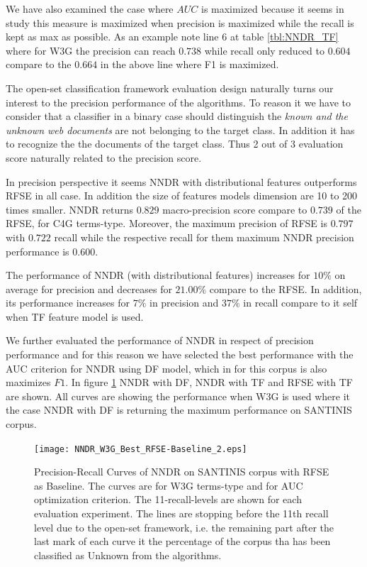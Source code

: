 We have also examined the case where $AUC$ is maximized because it seems in \cite{pritsos2018open} study this measure is maximized when precision is maximized while the recall is kept as max as possible. As an example note line 6 at table \ref{tbl:NNDR_TF} where for W3G the precision can reach $0.738$ while recall only reduced to $0.604$ compare to the $0.664$ in the above line where F1 is maximized.

The open-set classification framework evaluation design naturally turns our interest to the precision performance of the algorithms. To reason it we have to consider that a classifier in a binary case should distinguish the \textit{known and the unknown web documents} are not belonging to the target class. In addition it has to recognize the the documents of the target class. Thus 2 out of 3 evaluation score naturally related to the precision score.

In precision perspective it seems NNDR with distributional features outperforms RFSE in all case. In addition the size of features models dimension are 10 to 200 times smaller. NNDR returns $0.829$ macro-precision score compare to $0.739$ of the RFSE, for C4G terms-type. Moreover, the maximum precision of RFSE is $0.797$ with $0.722$ recall while the respective recall for them maximum NNDR precision performance is $0.600$.

The performance of NNDR (with distributional features) increases for $10\%$ on average for precision and decreases for $21.00\%$ compare to the RFSE. In addition, its performance increases for $7\%$ in precision and $37\%$ in recall compare to it self when TF feature model is used.

We further evaluated the performance of NNDR in respect of precision performance and for this reason we have selected the best performance with the AUC criterion for NNDR using DF model, which in for this corpus is also maximizes $F1$. In figure \ref{fig:NNDR_W3G_Best_RFSE_Baseline} NNDR with DF, NNDR with TF and RFSE with TF are shown. All curves are showing the performance when W3G is used where it the case NNDR with DF is returning the maximum performance on SANTINIS corpus.

\begin{figure}[H]
\begin{center}
    \texttt{[image: NNDR\_W3G\_Best\_RFSE-Baseline\_2.eps]}
	\caption{Precision-Recall Curves of NNDR on SANTINIS corpus with RFSE as Baseline. The curves are for W3G terms-type and for AUC optimization criterion. The 11-recall-levels are shown for each evaluation experiment. The lines are stopping before the 11th recall level due to the open-set framework, i.e. the remaining part after the last mark of each curve it the percentage of the corpus tha has been classified as Unknown from the algorithms.}
	\label{fig:NNDR_W3G_Best_RFSE_Baseline}
	\end{center}
\end{figure}

